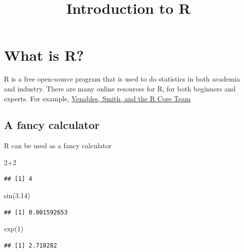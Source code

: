 \documentclass[
]{article}
\title{Introduction to R}
\author{}
\date{\vspace{-2.5em}}
\newenvironment{Shaded}{\begin{snugshade}}{\end{snugshade}}
\newcommand{\DecValTok}[1]{\textcolor[rgb]{0.00,0.00,0.81}{#1}}
\newcommand{\FloatTok}[1]{\textcolor[rgb]{0.00,0.00,0.81}{#1}}
\newcommand{\FunctionTok}[1]{\textcolor[rgb]{0.00,0.00,0.00}{#1}}
\newcommand{\NormalTok}[1]{#1}
\newcommand{\SpecialCharTok}[1]{\textcolor[rgb]{0.00,0.00,0.00}{#1}}
\theoremstyle{definition}
\theoremstyle{definition}
\theoremstyle{definition}
\theoremstyle{remark}
\begin{document}
\maketitle

{
\setcounter{tocdepth}{2}
\tableofcontents
}
\hypertarget{what-is-r}{%
\section{What is R?}\label{what-is-r}}

R is a free open-source program that is used to do statistics in both academia and industry. There are many online resources for R, for both beginners and experts. For example, \href{https://cran.r-project.org/doc/manuals/r-release/R-intro.pdf}{Venables, Smith, and the R Core Team}

\hypertarget{a-fancy-calculator}{%
\subsection{A fancy calculator}\label{a-fancy-calculator}}

R can be used as a fancy calculator

\begin{Shaded}
\begin{Highlighting}[]
\DecValTok{2}\SpecialCharTok{+}\DecValTok{2}
\end{Highlighting}
\end{Shaded}

\begin{verbatim}
## [1] 4
\end{verbatim}

\begin{Shaded}
\begin{Highlighting}[]
\FunctionTok{sin}\NormalTok{(}\FloatTok{3.14}\NormalTok{)}
\end{Highlighting}
\end{Shaded}

\begin{verbatim}
## [1] 0.001592653
\end{verbatim}

\begin{Shaded}
\begin{Highlighting}[]
\FunctionTok{exp}\NormalTok{(}\DecValTok{1}\NormalTok{)}
\end{Highlighting}
\end{Shaded}

\begin{verbatim}
## [1] 2.718282
\end{verbatim}
\end{document}
